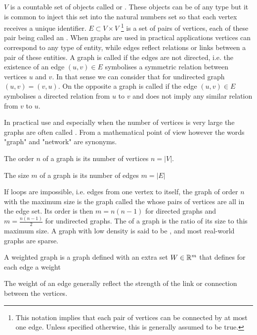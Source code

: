 $V$ is a countable set of objects called  or . These objects can be of any type but it is common to inject this set into the natural numbers set so that each vertex receives a unique identifier.
$E \subset V\times V$ \footnote{This notation implies that each pair of vertices can be connected by at most one edge. Unless specified otherwise, this is generally assumed to be true.} is a set of pairs of vertices, each of these pair being called an .
When graphs are used in practical applications vertices can correspond to any type of entity, while edges reflect relations or links between a pair of these entities. A graph is called  if the edges are not directed, i.e. the existence of an edge $(u, v) \in E$ symbolises a symmetric relation between vertices $u$ and $v$. In that sense we can consider that for undirected graph $(u, v) = (v, u)$. On the opposite a graph is called  if the edge $(u,v) \in E$ symbolises a directed relation from $u$ to $v$ and does not imply any similar relation from $v$ to $u$.

In practical use and especially when the number of vertices is very large the graphs are often called . From a mathematical point of view however the words "graph" and "network" are synonyms.

\begin{definition}
    The order $n$ of a graph is its number of vertices $n = |V|$.

    The size $m$ of a graph is its number of edges $m = |E|$
\end{definition}

If loops are impossible, i.e. edges from one vertex to itself, the graph of order $n$ with the maximum size is the graph called the  whose pairs of vertices are all in the edge set. Its order is then $m = n(n-1)$ for directed graphs and $m=\frac{n(n-1)}{2}$ for undirected graphs. The  of a graph is the ratio of its size to this maximum size. A graph with low density is said to be , and most real-world graphs are sparse.

\begin{definition}
    A weighted graph is a graph defined with an extra set $W \in \mathbb{R}^m$ that defines for each edge a weight
\end{definition}

The weight of an edge generally reflect the strength of the link or connection between the vertices.


